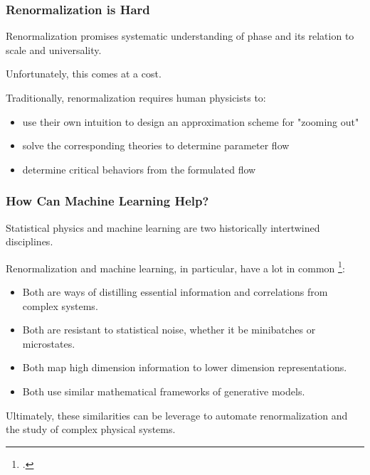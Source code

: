 \documentclass[aspectratio=169, 12pt]{beamer}
\begin{document}
\begin{frame}

    \frametitle{Renormalization is \textbf{Hard}}

    Renormalization promises systematic understanding of phase and its relation to scale and universality. 

    \vspace{1em}

    Unfortunately, this comes at a cost. 

    \vspace{1em}
    
    Traditionally, renormalization requires human physicists to:

    \begin{itemize}
        \item use their own intuition to design an approximation scheme for "zooming out"
        \item solve the corresponding theories to determine parameter flow
        \item determine critical behaviors from the formulated flow
    \end{itemize}

\end{frame}

\begin{frame}

    \frametitle{How Can Machine Learning Help?}

    Statistical physics and machine learning are two historically intertwined disciplines. 

    Renormalization and machine learning, in particular, have a lot in common \footcite{mlrg}:

    \begin{itemize}
        \item Both are ways of distilling essential information and correlations from complex systems. 
        \item Both are resistant to statistical noise, whether it be minibatches or microstates. 
        \item Both map high dimension information to lower dimension representations. 
        \item Both use similar mathematical frameworks of generative models. 
    \end{itemize}

    Ultimately, these similarities can be leverage to automate renormalization and the study of complex physical systems. 

\end{frame}
\end{document}
